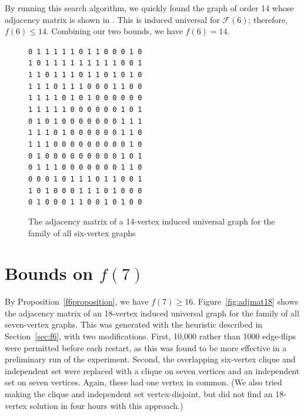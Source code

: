\documentclass[12pt]{article}
\newcommand{\calF}{\ensuremath{\mathcal{F}}}
\begin{document}
By running this search algorithm, we quickly found the graph of order 14 whose adjacency
matrix is shown in .  This is induced universal for $\calF(6)$;
therefore, $f(6) \leq 14$.  Combining our two bounds, we have $f(6) = 14$.

\begin{figure}[htb]
\centering
\scriptsize
\verb|0 1 1 1 1 1 0 1 1 0 0 0 1 0| \\
\verb|1 0 1 1 1 1 1 1 1 1 1 0 0 1| \\
\verb|1 1 0 1 1 1 0 1 1 0 1 0 1 0| \\
\verb|1 1 1 0 1 1 1 0 0 0 1 1 0 0| \\
\verb|1 1 1 1 0 1 0 1 0 0 0 0 0 0| \\
\verb|1 1 1 1 1 0 0 0 0 0 0 1 0 1| \\
\verb|0 1 0 1 0 0 0 0 0 0 0 1 1 1| \\
\verb|1 1 1 0 1 0 0 0 0 0 0 1 1 0| \\
\verb|1 1 1 0 0 0 0 0 0 0 0 0 1 0| \\
\verb|0 1 0 0 0 0 0 0 0 0 0 1 0 1| \\
\verb|0 1 1 1 0 0 0 0 0 0 0 1 1 0| \\
\verb|0 0 0 1 0 1 1 1 0 1 1 0 0 1| \\
\verb|1 0 1 0 0 0 1 1 1 0 1 0 0 0| \\
\verb|0 1 0 0 0 1 1 0 0 1 0 1 0 0|
\caption{The adjacency matrix of a 14-vertex induced universal graph for the family of all
six-vertex graphs}
\label{fig:adjmat14}
\end{figure}

\section{Bounds on \texorpdfstring{$f(7)$}{f(7)}}\label{sec:f7}

By Proposition~\ref{f6proposition}, we have $f(7) \geq 16$.  Figure~\ref{fig:adjmat18}
shows the adjacency matrix of an 18-vertex induced universal
graph for the family of all seven-vertex graphs. This was generated with 
the heuristic described in Section~\ref{sec:f6}, with two modifications.
First, 10,000 rather than 1000
edge-flips were permitted before each restart, as this was found to be more effective
in a preliminary run of the experiment.  Second, the overlapping six-vertex clique
and independent set were replaced with a clique on seven vertices and an independent
set on seven vertices.  Again, these had one vertex in common.  (We also tried making
the clique and independent set vertex-disjoint, but did not find an 18-vertex solution
in four hours with this approach.)
\end{document}
